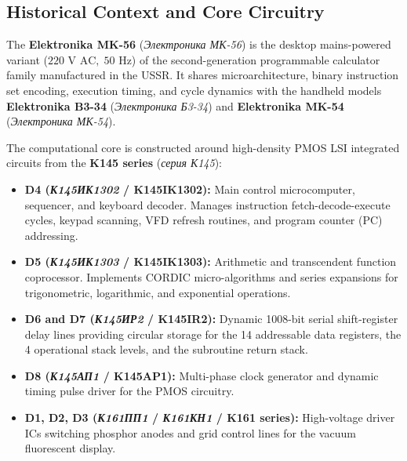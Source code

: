 \documentclass[11pt,a4paper]{article}
\begin{document}
\subsection{Historical Context and Core Circuitry}
The \textbf{Elektronika MK-56} (\textit{Электроника МК-56}) is the desktop mains-powered variant ($220\text{ V AC},\; 50\text{ Hz}$) of the second-generation programmable calculator family manufactured in the USSR. It shares microarchitecture, binary instruction set encoding, execution timing, and cycle dynamics with the handheld models \textbf{Elektronika B3-34} (\textit{Электроника Б3-34}) and \textbf{Elektronika MK-54} (\textit{Электроника МК-54}).

The computational core is constructed around high-density PMOS LSI integrated circuits from the \textbf{K145 series} (\textit{серия К145}):
\begin{itemize}
    \item \textbf{D4 (\textit{К145ИК1302} / K145IK1302):} Main control microcomputer, sequencer, and keyboard decoder. Manages instruction fetch-decode-execute cycles, keypad scanning, VFD refresh routines, and program counter (PC) addressing.
    \item \textbf{D5 (\textit{К145ИК1303} / K145IK1303):} Arithmetic and transcendent function coprocessor. Implements CORDIC micro-algorithms and series expansions for trigonometric, logarithmic, and exponential operations.
    \item \textbf{D6 and D7 (\textit{К145ИР2} / K145IR2):} Dynamic 1008-bit serial shift-register delay lines providing circular storage for the 14 addressable data registers, the 4 operational stack levels, and the subroutine return stack.
    \item \textbf{D8 (\textit{К145АП1} / K145AP1):} Multi-phase clock generator and dynamic timing pulse driver for the PMOS circuitry.
    \item \textbf{D1, D2, D3 (\textit{К161ПП1} / \textit{К161КН1} / K161 series):} High-voltage driver ICs switching phosphor anodes and grid control lines for the vacuum fluorescent display.
\end{itemize}
\end{document}
